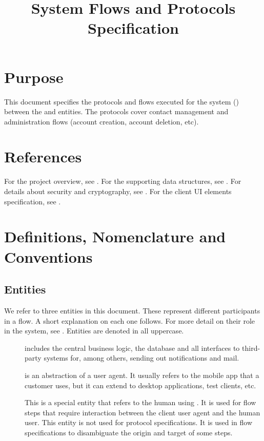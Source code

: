 \documentclass[a4paper,10pt]{article}
\title{\longProduct{} System Flows and Protocols Specification}
\begin{document}
\maketitle
\tableofcontents

\section{Purpose}
This document specifies the protocols and flows executed for the \longProduct{} system (\shortProduct{}) between the \server{} and \client{} entities. The protocols cover contact 
management and administration flows (account creation, account deletion, etc).

\section{References}
For the project overview, see \cite{project_spec}. For the supporting data structures, see \cite{data_structure_spec}. For details about security and cryptography, 
see \cite{crypto_spec}. For the client UI elements specification, see \cite{UI_spec}.

\section{Definitions, Nomenclature and Conventions}

\subsection{Entities}
We refer to three entities in this document. These represent different participants in a flow. A short explanation on each one follows. For more detail on their role in the 
system, see \cite{project_spec}. Entities are denoted in all uppercase.

\begin{description}
 \item[\Server{}] includes the central business logic, the database and all interfaces to third-party systems for, among others, sending out notifications and mail.
 \item[\Client{}] is an abstraction of a user agent. It usually refers to the mobile app that a customer uses, but it can extend to desktop applications, test clients, etc.
 \item[\User{}] This is a special entity that refers to the human using \Client{}. It is used for flow steps that require interaction between the client user agent and the human 
user. This entity is not used for protocol specifications. It is used in flow specifications to disambiguate the origin and target of some steps.
\end{description}
\end{document}
